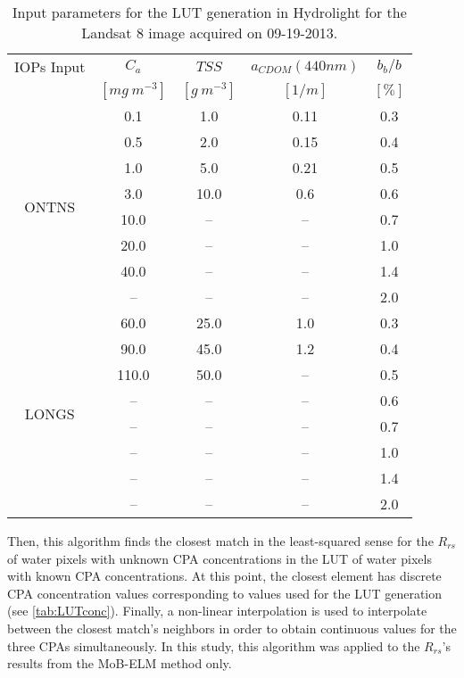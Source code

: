 \documentclass[]{spie}  %
\begin{document}
\begin{table}[htb]
\caption{Input parameters for the LUT generation in Hydrolight for the Landsat 8 image acquired on 09-19-2013. \label{tab:LUTconc}} 
\vspace{.07cm}
\small
\centering
    \begin{tabular}{ccccc}
    \hline \hline
            IOPs Input & \bfseries{$C_a$} & \bfseries{$TSS$} & \bfseries{$a_{CDOM}(440nm)$} & \bfseries{$b_b/b$}    \\
                   & $[mg~m^{-3}]$        & $[g~m^{-3}]$       &  $[1/m]$           & $[\%]$            \\ \hline \hline
\multirow{8}{*}{ONTNS}  &  0.1    	& 1.0     &  0.11   &  0.3  \\
   	&  0.5    	& 2.0   &  0.15   	&  0.4  \\
    &  1.0    	& 5.0   &  0.21   	&  0.5  \\
    &  3.0    	& 10.0  &  0.6    	&  0.6  \\ 
    &  10.0     & --    &  --   	&  0.7  \\  
    &  20.0     & --    &  --   	&  1.0  \\  
    &  40.0     & --    &  --   	&  1.4  \\
    &  --       & --    &  --   	&  2.0  \\ \hline

\multirow{8}{*}{LONGS}   &  60.0   & 25.0    &  1.0    &  0.3  \\
    &  90.0   & 45.0    &  1.2    &  0.4  \\
    &  110.0  & 50.0    &  --     &  0.5  \\
    &  --     & --      &  --     &  0.6  \\  
    &  --     & --      &  --     &  0.7  \\  
    &  --     & --      &  --     &  1.0  \\   
    &  --     & --      &  --     &  1.4  \\  
    &  --     & --      &  --     &  2.0  \\  \hline \hline
    \end{tabular}
  \end{table}

Then, this algorithm finds the closest match in the least-squared sense for the $R_{rs}$ of water pixels with unknown CPA concentrations in the LUT of water pixels with known CPA concentrations. At this point, the closest element has discrete CPA concentration values corresponding to values used for the LUT generation (see \autoref{tab:LUTconc}). Finally, a non-linear interpolation is used to interpolate between the closest match's neighbors in order to obtain continuous values for the three CPAs simultaneously. In this study, this algorithm was applied to the $R_{rs}$'s results from the MoB-ELM method only.
\end{document}

